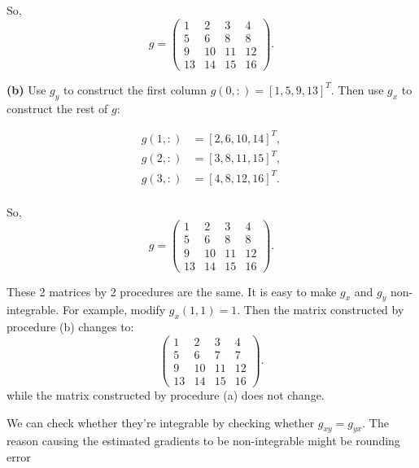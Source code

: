 \documentclass[
  course = {{16-720B Computer Vision}},
  quartile = {{1}},
  assignment = 5\ -\ 3D\ Reconstruction\ \&\ Photometric\ Stereo,
  name = {{Kangle Deng}},
  email = {{kangled@andrew.cmu.edu}},
  firstexercise = 1
]{aga-homework}
\begin{document}
So,
\begin{equation*}
    g = \left(\begin{array}{cccc}
        1 & 2 & 3 & 4 \\
        5 & 6 & 8 & 8 \\
        9 & 10 & 11 & 12 \\
        13 & 14 & 15 & 16
    \end{array}\right).
\end{equation*}

\noindent\textbf{(b)} Use $g_y$ to construct the first column $g(0,:)=[1,5,9,13]^T$. Then use $g_x$ to construct the rest of $g$:

\begin{equation*}
    \begin{aligned}
          g(1,:) &= [2,6,10,14]^T, \\
          g(2,:) &= [3,8,11,15]^T, \\
          g(3,:) &= [4,8,12,16]^T. \\
    \end{aligned}
\end{equation*}

So,
\begin{equation*}
    g = \left(\begin{array}{cccc}
        1 & 2 & 3 & 4 \\
        5 & 6 & 8 & 8 \\
        9 & 10 & 11 & 12 \\
        13 & 14 & 15 & 16
    \end{array}\right).
\end{equation*}

These 2 matrices by 2 procedures are the same. It is easy to make $g_x$ and $g_y$ non-integrable. For example, modify $g_x(1,1) = 1$. Then the matrix constructed by procedure (b) changes to:
\begin{equation*}
    \left(\begin{array}{cccc}
        1 & 2 & 3 & 4 \\
        5 & 6 & 7 & 7 \\
        9 & 10 & 11 & 12 \\
        13 & 14 & 15 & 16
    \end{array}\right).
\end{equation*}
while the matrix constructed by procedure (a) does not change. 

We can check whether they're integrable by checking whether $g_{xy} = g_{yx}$. The reason causing the estimated gradients to be non-integrable might be rounding error
\end{document}
